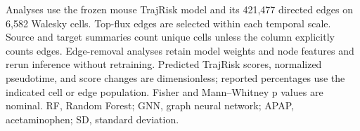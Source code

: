 Analyses use the frozen mouse TrajRisk model and its 421,477 directed edges on 6,582 Walesky cells. Top-flux edges are selected within each temporal scale. Source and target summaries count unique cells unless the column explicitly counts edges. Edge-removal analyses retain model weights and node features and rerun inference without retraining. Predicted TrajRisk scores, normalized pseudotime, and score changes are dimensionless; reported percentages use the indicated cell or edge population. Fisher and Mann--Whitney p values are nominal. RF, Random Forest; GNN, graph neural network; APAP, acetaminophen; SD, standard deviation.